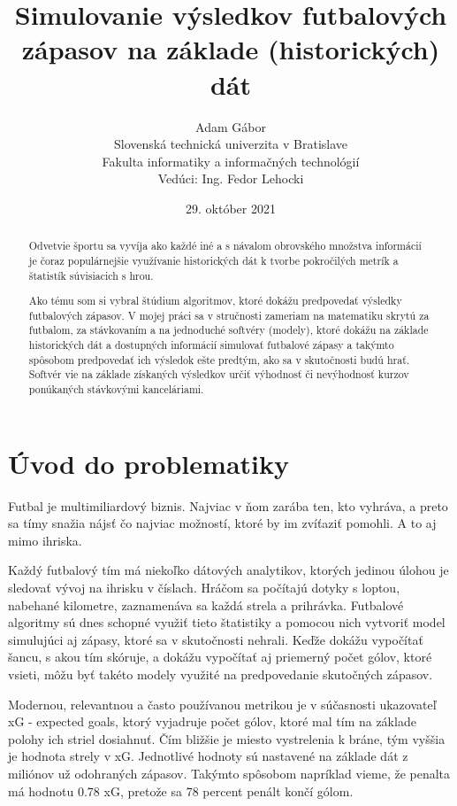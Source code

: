 \documentclass[10pt,twoside,slovak,a4paper]{article}
\title{Simulovanie výsledkov futbalových zápasov na základe (historických) dát}
\author{Adam Gábor\\[2pt]
	{\small Slovenská technická univerzita v Bratislave}\\
	{\small Fakulta informatiky a informačných technológií}\\
	{\small Vedúci: Ing. Fedor Lehocki}\\
	}
\date{\small 29. október 2021}
\begin{document}
\maketitle

\begin{abstract}
Odvetvie športu sa vyvíja ako každé iné a s návalom obrovského množstva informácií je čoraz populárnejšie využívanie historických dát k tvorbe pokročilých metrík a štatistík súvisiacich s hrou.

Ako tému som si vybral štúdium algoritmov, ktoré dokážu predpovedať výsledky futbalových zápasov. V mojej práci sa v stručnosti zameriam na matematiku skrytú za futbalom, za stávkovaním a na jednoduché softvéry (modely), ktoré dokážu na základe historických dát a dostupných informácií simulovať futbalové zápasy a takýmto spôsobom predpovedať ich výsledok ešte predtým, ako sa v skutočnosti budú hrať. Softvér vie na základe získaných výsledkov určiť výhodnosť či nevýhodnosť kurzov ponúkaných stávkovými kanceláriami.

\end{abstract}

\section{Úvod do problematiky}

Futbal je multimiliardový biznis. Najviac v ňom zarába ten, kto vyhráva, a preto sa tímy snažia nájsť čo najviac možností, ktoré by im zvíťaziť pomohli. A to aj mimo ihriska.

Každý futbalový tím má niekoľko dátových analytikov, ktorých jedinou úlohou je sledovať vývoj na ihrisku v číslach. Hráčom sa počítajú dotyky s loptou, nabehané kilometre, zaznamenáva sa každá strela a prihrávka. Futbalové algoritmy sú dnes schopné využiť tieto štatistiky a pomocou nich vytvoriť model simulujúci aj zápasy, ktoré sa v skutočnosti nehrali. Keďže dokážu vypočítať šancu, s akou tím skóruje, a dokážu vypočítať aj priemerný počet gólov, ktoré vsieti, môžu byť takéto modely využité na predpovedanie skutočných zápasov.

Modernou, relevantnou a často používanou metrikou je v súčasnosti ukazovateľ xG - expected goals, ktorý vyjadruje počet gólov, ktoré mal tím na základe polohy ich striel dosiahnuť. Čím bližšie je miesto vystrelenia k bráne, tým vyššia je hodnota strely v xG. Jednotlivé hodnoty sú nastavené na základe dát z miliónov už odohraných zápasov. Takýmto spôsobom napríklad vieme, že penalta má hodnotu 0.78 xG, pretože sa 78 percent penált končí gólom.
\end{document}
